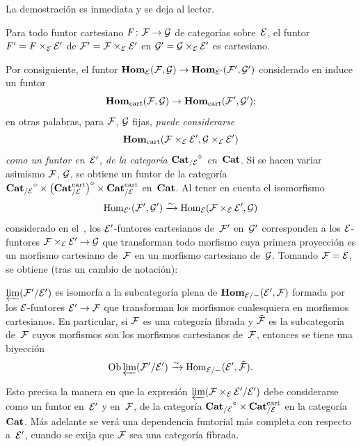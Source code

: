 La demostración es inmediata y se deja al lector.

\begin{corollaire}
\label{VI.6.7}
Para todo funtor cartesiano $F\colon\cal{F}\to\cal{G}$ de categorías
sobre~$\cal{E}$, el funtor $F'=F\times_{\cal{E}}\cal{E}'$ de
$\cal{F}'=\cal{F}\times_{\cal{E}}\cal{E}'$ en
$\cal{G}'=\cal{G}\times_{\cal{E}}\cal{E}'$ es cartesiano.
\end{corollaire}

Por consiguiente, el funtor $\SheafHom_{\cal{E}}(\cal{F},\cal{G})\to
\SheafHom_{\cal{E}'}(\cal{F}',\cal{G}')$ considerado en
\No {} induce un funtor
$$
\SheafHom_\cart(\cal{F},\cal{G})\to
\SheafHom_\cart(\cal{F}',\cal{G}') \rm{;}
$$
en otras palabras, para $\cal{F}$, $\cal{G}$ fijas, \emph{puede
considerarse}
$$
\SheafHom_\cart(\cal{F}\times_{\cal{E}}\cal{E}',
\cal{G}\times_{\cal{E}}\cal{E}')
$$
\emph{como
un funtor en~$\cal{E}'$, de la categoría
${\Cat_{/\cal{E}}}^\circ$ en~$\Cat$}. Si se hacen variar asimismo
$\cal{F}$, $\cal{G}$, se obtiene%
un funtor de la categoría ${\Cat_{/\cal{E}}}^\circ\times\big(
\Cat^\cart_{/\cal{E}}\big)^\circ\times\Cat^\cart_{/\cal{E}}$
en~$\Cat$. Al tener en cuenta el isomorfismo
$$
\Hom_{\cal{E}'}(\cal{F}',\cal{G}') \isomto
\Hom_\cal{E}(\cal{F}\times_\cal{E}\cal{E}',\cal{G})
$$
considerado en el~\No {}, los $\cal{E}'$-funtores cartesianos
de~$\cal{F}'$ en~$\cal{G}'$ corresponden a los $\cal{E}$-funtores
$\cal{F}\times_\cal{E}\cal{E}'\to\cal{G}$ que transforman todo morfismo
cuya primera proyección es un morfismo cartesiano de~$\cal{F}$ en un
morfismo cartesiano de~$\cal{G}$. Tomando $\cal{F}=\cal{E}$, se obtiene
(tras un cambio de notación):

\begin{corollaire}
\label{VI.6.8}
$\varprojLim(\cal{F}'/\cal{E}')$ es isomorfa a la subcategoría plena de
$\SheafHom_{\cal{E}/-}(\cal{E}',\cal{F})$ formada por los
$\cal{E}$-funtores $\cal{E}'\to\cal{F}$ que transforman los morfismos
cualesquiera en morfismos cartesianos.
En particular, si $\cal{F}$ es una categoría fibrada y
$\tilde{\cal{F}}$ es la subcategoría de~$\cal{F}$ cuyos morfismos son
los morfismos cartesianos de~$\cal{F}$, entonces se tiene una biyección
$$
\Ob \varprojLim(\cal{F}'/\cal{E}') \isomto
\Hom_{\cal{E}/-}(\cal{E}',\tilde{\cal{F}}) \rm{.}
$$
\end{corollaire}

Esto precisa la manera en que la expresión
$\varprojLim(\cal{F}\times_{\cal{E}}\cal{E}'/\cal{E}')$ debe considerarse
como un funtor en~$\cal{E}'$ y en~$\cal{F}$, de la categoría
${\Cat_{/\cal{E}}}^\circ\times\Cat^\cart_{/\cal{E}}$ en la categoría
$\Cat$. Más adelante se verá una dependencia funtorial más completa con
respecto a~$\cal{E}'$, cuando se exija que $\cal{F}$ sea una categoría
fibrada.


